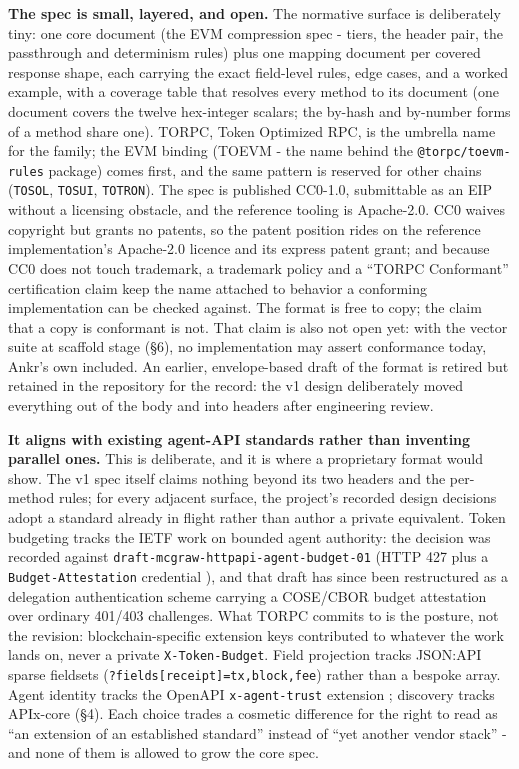 \documentclass[11pt]{article}
\newcommand{\code}[1]{\texttt{#1}}
\begin{document}
\textbf{The spec is small, layered, and open.} The normative surface is deliberately tiny: one core document (the EVM compression spec - tiers, the header pair, the passthrough and determinism rules) plus one mapping document per covered response shape, each carrying the exact field-level rules, edge cases, and a worked example, with a coverage table that resolves every method to its document (one document covers the twelve hex-integer scalars; the by-hash and by-number forms of a method share one). TORPC, Token Optimized RPC, is the umbrella name for the family; the EVM binding (TOEVM - the name behind the \code{@torpc/toevm-rules} package) comes first, and the same pattern is reserved for other chains (\code{TOSOL}, \code{TOSUI}, \code{TOTRON}). The spec is published CC0-1.0, submittable as an EIP without a licensing obstacle, and the reference tooling is Apache-2.0. CC0 waives copyright but grants no patents, so the patent position rides on the reference implementation's Apache-2.0 licence and its express patent grant; and because CC0 does not touch trademark, a trademark policy and a ``TORPC Conformant'' certification claim keep the name attached to behavior a conforming implementation can be checked against. The format is free to copy; the claim that a copy is conformant is not. That claim is also not open yet: with the vector suite at scaffold stage (\S6), no implementation may assert conformance today, Ankr's own included. An earlier, envelope-based draft of the format is retired but retained in the repository for the record: the v1 design deliberately moved everything out of the body and into headers after engineering review.

\textbf{It aligns with existing agent-API standards rather than inventing parallel ones.} This is deliberate, and it is where a proprietary format would show. The v1 spec itself claims nothing beyond its two headers and the per-method rules; for every adjacent surface, the project's recorded design decisions adopt a standard already in flight rather than author a private equivalent. Token budgeting tracks the IETF work on bounded agent authority: the decision was recorded against \code{draft-mcgraw-httpapi-agent-budget-01} (HTTP 427 plus a \code{Budget-Attestation} credential \cite{budget427}), and that draft has since been restructured as a delegation authentication scheme carrying a COSE/CBOR budget attestation over ordinary 401/403 challenges. What TORPC commits to is the posture, not the revision: blockchain-specific extension keys contributed to whatever the work lands on, never a private \code{X-Token-Budget}. Field projection tracks JSON:API sparse fieldsets \cite{jsonapi} (\code{?fields[receipt]=tx,block,fee}) rather than a bespoke array. Agent identity tracks the OpenAPI \code{x-agent-trust} extension \cite{xagent}; discovery tracks APIx-core \cite{apix} (\S4). Each choice trades a cosmetic difference for the right to read as ``an extension of an established standard'' instead of ``yet another vendor stack'' - and none of them is allowed to grow the core spec.
\end{document}
